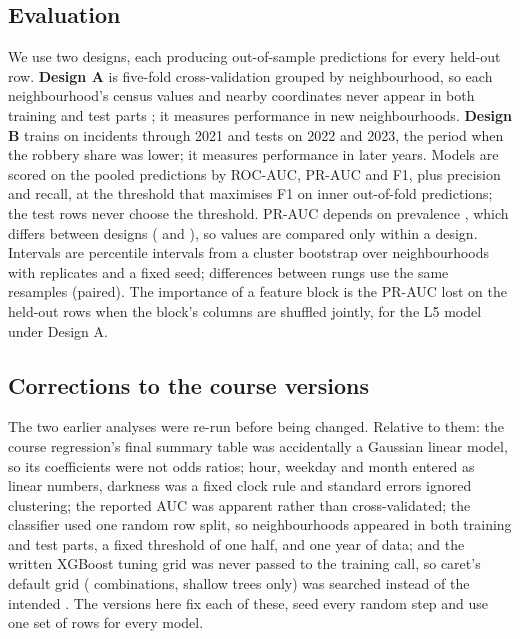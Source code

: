 \subsection{Evaluation}
We use two designs, each producing out-of-sample predictions for every held-out row. \textbf{Design A} is five-fold cross-validation grouped by neighbourhood, so each neighbourhood's census values and nearby coordinates never appear in both training and test parts \citep{roberts2017cv}; it measures performance in new neighbourhoods. \textbf{Design B} trains on incidents through 2021 and tests on 2022 and 2023, the period when the robbery share was lower; it measures performance in later years. Models are scored on the pooled predictions by ROC-AUC, PR-AUC and F1, plus precision and recall, at the threshold that maximises F1 on inner out-of-fold predictions; the test rows never choose the threshold. PR-AUC depends on prevalence \citep{saito2015pr}, which differs between designs ( and ), so values are compared only within a design. Intervals are percentile intervals from a cluster bootstrap over neighbourhoods \citep{efron1993bootstrap} with  replicates and a fixed seed; differences between rungs use the same resamples (paired). The importance of a feature block is the PR-AUC lost on the held-out rows when the block's columns are shuffled jointly, for the L5 model under Design A.

\subsection{Corrections to the course versions}
The two earlier analyses were re-run before being changed. Relative to them: the course regression's final summary table was accidentally a Gaussian linear model, so its coefficients were not odds ratios; hour, weekday and month entered as linear numbers, darkness was a fixed clock rule and standard errors ignored clustering; the reported AUC was apparent rather than cross-validated; the classifier used one random row split, so neighbourhoods appeared in both training and test parts, a fixed threshold of one half, and one year of data; and the written XGBoost tuning grid was never passed to the training call, so caret's default grid ( combinations, shallow trees only) was searched instead of the intended . The versions here fix each of these, seed every random step and use one set of rows for every model.
